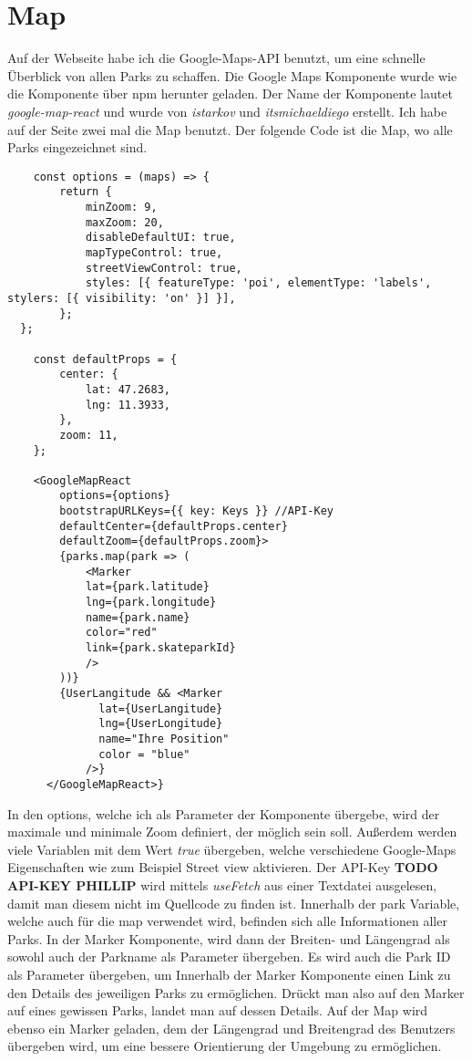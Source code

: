 \section{Map}
\label{map}

Auf der Webseite habe ich die Google-Maps-API benutzt, um eine schnelle Überblick von allen Parks
zu schaffen. Die Google Maps Komponente wurde wie die  Komponente über npm 
herunter geladen. Der Name der Komponente lautet \textit{google-map-react} und wurde von \textit{istarkov}
und \textit{itsmichaeldiego} erstellt. Ich habe auf der Seite zwei mal die Map benutzt. Der folgende 
Code ist die Map, wo alle Parks eingezeichnet sind.

\begin{lstlisting}
    const options = (maps) => {
        return {
            minZoom: 9,
            maxZoom: 20,
            disableDefaultUI: true,
            mapTypeControl: true,
            streetViewControl: true,
            styles: [{ featureType: 'poi', elementType: 'labels', stylers: [{ visibility: 'on' }] }],
        };
  };

    const defaultProps = {
        center: {
            lat: 47.2683,
            lng: 11.3933,
        },
        zoom: 11,
    };
    
    <GoogleMapReact
        options={options}
        bootstrapURLKeys={{ key: Keys }} //API-Key
        defaultCenter={defaultProps.center}
        defaultZoom={defaultProps.zoom}>
        {parks.map(park => (
            <Marker
            lat={park.latitude}
            lng={park.longitude}
            name={park.name}
            color="red"
            link={park.skateparkId}
            />  
        ))}
        {UserLangitude && <Marker
              lat={UserLangitude}
              lng={UserLongitude}
              name="Ihre Position"
              color = "blue"
            />}
      </GoogleMapReact>}
\end{lstlisting}

In den options, welche ich als Parameter der Komponente übergebe, wird der maximale und minimale Zoom 
definiert, der möglich sein soll. Außerdem werden viele Variablen mit dem Wert \textit{true} übergeben, 
welche verschiedene Google-Maps Eigenschaften wie zum Beispiel Street view aktivieren. Der API-Key \textbf{TODO API-KEY PHILLIP}
wird mittels \textit{useFetch} aus einer Textdatei ausgelesen, damit man diesem nicht im Quellcode zu 
finden ist. Innerhalb der park Variable, welche auch für die map verwendet wird, befinden sich alle 
Informationen aller Parks. In der Marker Komponente, wird dann der Breiten- und Längengrad als sowohl auch
der Parkname als Parameter übergeben. Es wird auch die Park ID als Parameter übergeben, um Innerhalb der 
Marker Komponente einen Link zu den Details des jeweiligen Parks zu ermöglichen. Drückt man also auf den Marker 
auf eines gewissen Parks, landet man auf dessen Details. Auf der Map wird ebenso ein Marker geladen, dem 
der Längengrad und Breitengrad des Benutzers übergeben wird, um eine bessere Orientierung der Umgebung 
zu ermöglichen.

